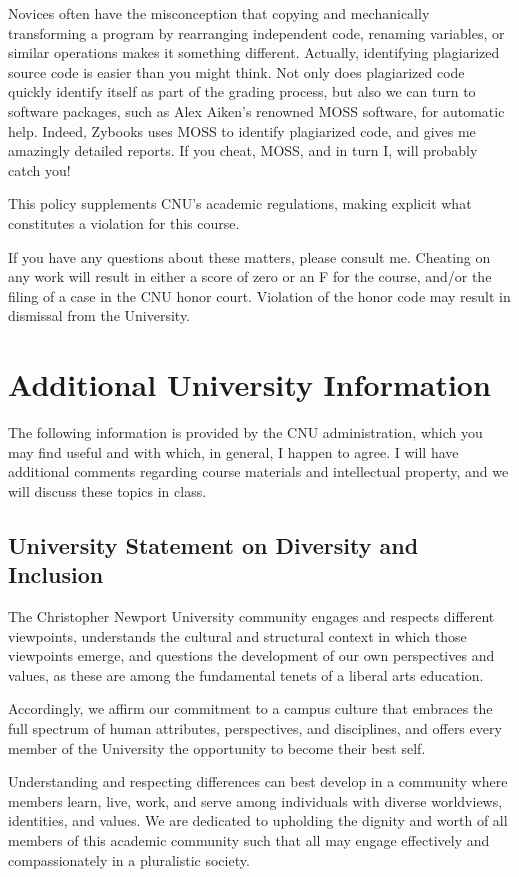 \documentclass[11pt]{article}
\begin{document}
Novices often have the misconception that copying and mechanically transforming a program by rearranging independent code, renaming variables, or similar operations makes it something different. Actually, identifying plagiarized source code is easier than you might think. Not only does plagiarized code quickly identify itself as part of the grading process, but also we can turn to software packages, such as Alex Aiken's renowned MOSS software, for automatic help. Indeed, Zybooks uses MOSS to identify plagiarized code, and gives me amazingly detailed reports. If you cheat, MOSS, and in turn I, will probably catch you!

This policy supplements CNU's academic regulations, making explicit what constitutes a violation for this course.

If you have any questions about these matters, please consult me. Cheating on any work will result in either a score of zero or an F for the course, and/or the filing of a case in the CNU honor court. Violation of the honor code may result in dismissal from the University.

\section{Additional University Information}

The following information is provided by the CNU administration, which you may find useful and with which, in general, I happen to agree. I will have additional comments regarding course materials and intellectual property, and we will discuss these topics in class.

\subsection{University Statement on Diversity and Inclusion}

The Christopher Newport University community engages and respects different viewpoints, understands the cultural and structural context in which those viewpoints emerge, and questions the development of our own perspectives and values, as these are among the fundamental tenets of a liberal arts education.

Accordingly, we affirm our commitment to a campus culture that embraces the full spectrum of human attributes, perspectives, and disciplines, and offers every member of the University the opportunity to become their best self.

Understanding and respecting differences can best develop in a community where members learn, live, work, and serve among individuals with diverse worldviews, identities, and values. We are dedicated to upholding the dignity and worth of all members of this academic community such that all may engage effectively and compassionately in a pluralistic society.
\end{document}
